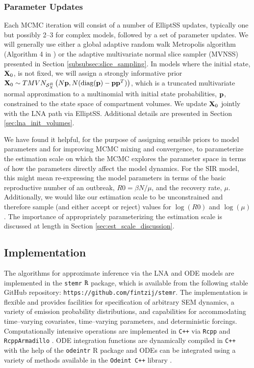 \subsubsection{Parameter Updates}
\label{subsubsec:lna_param_updates}
Each MCMC iteration will consist of a number of ElliptSS updates, typically one but possibly 2--3 for complex models, followed by a set of parameter updates. We will generally use either a global adaptive random walk Metropolis algorithm (Algorithm 4 in \cite{andrieu2008tutorial}) or the adaptive multivariate normal slice sampler (MVNSS) presented in Section \ref{subsubsec:slice_sampling}. In models where the initial state, $ \mathbf{X}_0 $, is not fixed, we will assign a strongly informative prior $ \mathbf{X}_0 \sim TMVN_{\mathcal{S}_X^R}\left (N\mathbf{p}, N(\mathrm{diag}(\mathbf{p}) - \mathbf{p}\mathbf{p}^T)\right ) $, which is a truncated multivariate normal approximation to a multinomial with initial state probabilities, $ \mathbf{p} $, constrained to the state space of compartment volumes. We update $ \mathbf{X}_0 $ jointly with the LNA path via ElliptSS. Additional details are presented in Section \ref{sec:lna_init_volumes}.

We have found it helpful, for the purpose of assigning sensible priors to model parameters and for improving MCMC mixing and convergence, to parameterize the estimation scale on which the MCMC explores the parameter space in terms of how the parameters directly affect the model dynamics. For the SIR model, this might mean re-expressing the model parameters in terms of the basic reproductive number of an outbreak, $ R0 = \beta N /\mu $, and the recovery rate, $ \mu $. Additionally, we would like our estimation scale to be unconstrained and therefore sample (and either accept or reject) values for $ \log(R0) $ and $ \log(\mu) $. The importance of appropriately parameterizing the estimation scale is discussed at length in Section \ref{sec:est_scale_discussion}. 

\subsection{Implementation}
\label{subsec:lna_implementation}
The algorithms for approximate inference via the LNA and ODE models are implemented in the \texttt{stemr} $ \mathtt{R} $ package, which is available from the following stable GitHub repository: \texttt{https://github.com/fintzij/stemr}. The implementation is flexible and provides facilities for specification of arbitrary SEM dynamics, a variety of emission probability distributions, and capabilities for accommodating time--varying covariates, time--varying parameters, and deterministic forcings. Computationally intensive operations are implemented in \texttt{C++} via \texttt{Rcpp} and \texttt{RcppArmadillo} \cite{rcpp,rcpparmadillo}. ODE integration functions are dynamically compiled in \texttt{C++} with the help of the \texttt{odeintr} R package \cite{odeintr} and ODEs can be integrated using a variety of methods available in the \texttt{Odeint C++} library \cite{ahnert2011odeint}.

